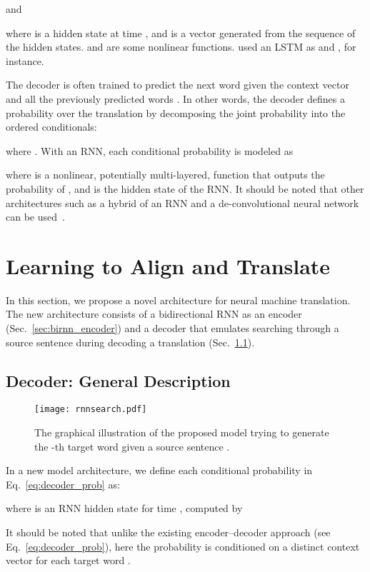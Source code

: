 and

where  is a hidden state at time , and  is a vector
generated from the sequence of the hidden states.  and  are some
nonlinear functions. \citet{Sutskever2014} used an LSTM as  and
, for instance.

The decoder is often trained to predict the next word  given the context
vector  and all the previously predicted words . In other words, the decoder defines a probability over the
translation  by decomposing the joint probability into the ordered
conditionals:

where . With an RNN, each
conditional probability is modeled as

where  is a nonlinear, potentially multi-layered, function that outputs the
probability of , and  is the hidden state of the RNN.  It should be
noted that other architectures such as a hybrid of an RNN and a
de-convolutional neural network can be used~\citep{Kalchbrenner2013}.

\section{Learning to Align and Translate}
\label{sec:main}

In this section, we propose a novel architecture for neural machine
translation.  The new architecture consists of a bidirectional RNN as an
encoder (Sec.~\ref{sec:birnn_encoder}) and a decoder that emulates
searching through a source sentence during decoding a translation
(Sec.~\ref{sec:search_decoder}). 

\subsection{Decoder: General Description}
\label{sec:search_decoder}

\begin{wrapfigure}{R}{0.3\textwidth}
    \centering
    \texttt{[image: rnnsearch.pdf]}
    \caption{
        The graphical illustration of the proposed model trying to
        generate the -th target word  given a source sentence .
    }
    \label{fig:rnnsearch}
\end{wrapfigure}

In a new model architecture, we define each conditional probability in
Eq.~\eqref{eq:decoder_prob} as:

where  is an RNN hidden state for time , computed by

It should be noted that unlike the existing encoder--decoder approach (see
Eq.~\eqref{eq:decoder_prob}), here the probability is conditioned on a distinct
context vector  for each target word . 


